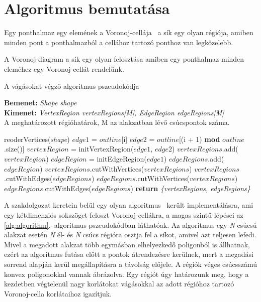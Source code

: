 \section{Algoritmus bemutatása}

\begin{definition}
	Egy ponthalmaz egy elemének a Voronoj-cellája~\cite{voronoj} a sík egy olyan régiója, amiben minden pont a ponthalmazból a cellához tartozó ponthoz van legközelebb.
\end{definition}

\begin{definition}
	A Voronoj-diagram a sík egy olyan felosztása amiben egy ponthalmaz minden eleméhez egy Voronoj-cellát rendelünk.
\end{definition}

\begin{algorithm}[H]
	\caption{A vágásokat végző algoritmus pszeudokódja}
	\label{alg:algorithm}
	\textbf{Bemenet:} \textit{Shape shape} \\
	\textbf{Kimenet:} \textit{VertexRegion vertexRegions[M], EdgeRegion edgeRegions[M]}\\A meghatározott régióhatárok, M az alakzatban lévő csúcspontok száma.
	\begin{algorithmic}[1]
		\State reoderVertices(\textit{shape})
		\State $edge1$ = $outline$[i]
		\State $edge2$ = $outline$[(i + 1) \textbf{mod} $outline$.size()]
		\State $vertexRegion$ = initVertexRegion($edge1$, $edge2$)
		\State $vertexRegions$.add($vertexRegion$)
		\State $edgeRegion$ = initEdgeRegion($edge1$)
		\State $edgeRegions$.add($edgeRegion$)
		\EndFor
		\EndFor
		\State $vertexRegions$.cutWithVertices($vertexRegions$)
		\State $vertexRegions$.cutWithEdges($edgeRegions$)
		\State $edgeRegions$.cutWithVertices($vertexRegions$)
		\State $edgeRegions$.cutWithEdges($edgeRegions$)
		\State \textbf{return} \textit{\{vertexRegions, edgeRegions\}}
	\end{algorithmic}
\end{algorithm}

A szakdolgozat keretein belül egy olyan algoritmus~\cite{sdfalgorithmpaper} került implementálásra, ami egy kétdimenziós sokszöget feloszt Voronoj-cellákra, a magas szintű lépései az \ref{alg:algorithm}.~algoritmus pszeudokódban láthatóak. Az algoritmus egy \textit{N} csúcsú alakzat esetén \textit{N} él- és \textit{N} csúcs régióra osztja fel a síkot, amivel azt teljesen lefedi. Mivel a megadott alakzat több egymásban elhelyezkedő poligonból is állhatnak, ezért az algoritmus futása előtt a pontok átrendezésre kerülnek, mert a megadási sorrend alapján kerül megállapításra a távolság előjele. A régiók véges csúcsszámú konvex poligonokkal vannak ábrázolva. Egy régiót úgy határozunk meg, hogy a kezdetben végtelenül nagy korlátokat vágásokkal az adott régióhoz tartozó Voronoj-cella korlátaihoz igazítjuk.

